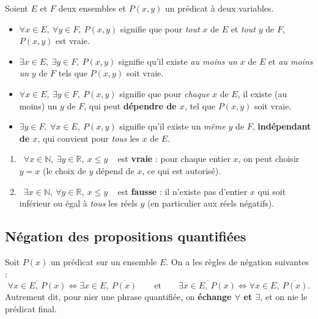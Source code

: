 \documentclass[a4paper,12pt,openany]{book}
\providecommand{\og}{\guillemotleft~}
\providecommand{\fg}{\ifhmode~\fi\guillemotright}
\begin{document}
\begin{definition}
Soient $E$ et $F$ deux ensembles et $P(x,y)$ un prédicat à deux variables.
\begin{itemize}
  \item $\forall x \in E,\ \forall y \in F,\ P(x,y)$ signifie que pour
  \emph{tout} $x$ de $E$ et \emph{tout} $y$ de $F$, $P(x,y)$ est vraie.
  \item $\exists x \in E,\ \exists y \in F,\ P(x,y)$ signifie qu'il existe
  \emph{au moins un} $x$ de $E$ et \emph{au moins un} $y$ de $F$ tels que
  $P(x,y)$ soit vraie.
  \item $\forall x \in E,\ \exists y \in F,\ P(x,y)$ signifie que pour
  \emph{chaque} $x$ de $E$, il existe (au moins) un $y$ de $F$, qui peut
  \textbf{dépendre de $x$}, tel que $P(x,y)$ soit vraie.
  \item $\exists y \in F,\ \forall x \in E,\ P(x,y)$ signifie qu'il existe un
  \emph{même} $y$ de $F$, \textbf{indépendant de $x$}, qui convient pour
  \emph{tous} les $x$ de $E$.
\end{itemize}
\end{definition}


\begin{exemple}
\begin{enumerate}
  \item \og $\forall x \in \mathbb{N},\ \exists y \in \mathbb{R},\ x \leq y$
  \fg{} est \textbf{vraie} : pour chaque entier $x$, on peut choisir $y=x$
  (le choix de $y$ dépend de $x$, ce qui est autorisé).
  \item \og $\exists x \in \mathbb{N},\ \forall y \in \mathbb{R},\ x \leq y$
  \fg{} est \textbf{fausse} : il n'existe pas d'entier $x$ qui soit inférieur
  ou égal à \emph{tous} les réels $y$ (en particulier aux réels négatifs).
\end{enumerate}
\end{exemple}

\subsection{Négation des propositions quantifiées}

\begin{proposition}
Soit $P(x)$ un prédicat sur un ensemble $E$. On a les règles de négation
suivantes :
\[
\overline{\forall x \in E,\ P(x)} \iff \exists x \in E,\ \overline{P(x)}
\qquad\text{et}\qquad
\overline{\exists x \in E,\ P(x)} \iff \forall x \in E,\ \overline{P(x)}.
\]
Autrement dit, pour nier une phrase quantifiée, on \textbf{échange
$\forall$ et $\exists$}, et on nie le prédicat final.
\end{proposition}
\end{document}
